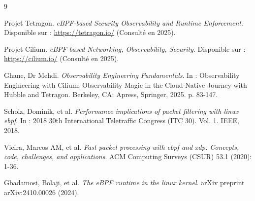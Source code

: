 \documentclass[a4paper,12pt]{article}
\begin{document}
\newpage
\begin{thebibliography}{9}

Projet Tetragon. \textit{eBPF-based Security Observability and Runtime Enforcement}. Disponible sur : \url{https://tetragon.io/} (Consulté en 2025).

Projet Cilium. \textit{eBPF-based Networking, Observability, Security}. Disponible sur : \url{https://cilium.io/} (Consulté en 2025).

Ghane, Dr Mehdi. \textit{Observability Engineering Fundamentals}. In : Observability Engineering with Cilium: Observability Magic in the Cloud-Native Journey with Hubble and Tetragon. Berkeley, CA: Apress, Springer, 2025. p. 83-147.

Scholz, Dominik, et al. \textit{Performance implications of packet filtering with linux ebpf}. In : 2018 30th International Teletraffic Congress (ITC 30). Vol. 1. IEEE, 2018.

Vieira, Marcos AM, et al. \textit{Fast packet processing with ebpf and xdp: Concepts, code, challenges, and applications}. ACM Computing Surveys (CSUR) 53.1 (2020): 1-36.

Gbadamosi, Bolaji, et al. \textit{The eBPF runtime in the linux kernel}. arXiv preprint arXiv:2410.00026 (2024).

\end{thebibliography}

\label{fin}
\end{document}
